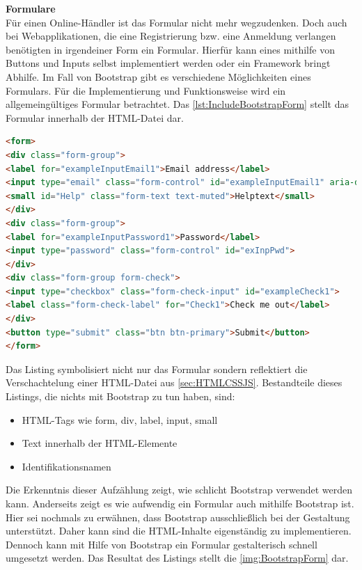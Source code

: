 \documentclass[a4paper,titlepage,halfparskip,12pt]{scrreprt}
\begin{document}
\begin{onehalfspacing}
\textbf{Formulare}\\
Für einen Online-Händler ist das Formular nicht mehr wegzudenken. Doch auch bei Webapplikationen, die eine Registrierung bzw. eine Anmeldung verlangen benötigten in irgendeiner Form ein Formular. Hierfür kann eines mithilfe von Buttons und Inputs selbst implementiert werden oder ein Framework bringt Abhilfe. Im Fall von Bootstrap gibt es verschiedene Möglichkeiten eines Formulars. Für die Implementierung und Funktionsweise wird ein allgemeingültiges Formular betrachtet. Das \autoref{lst:IncludeBootstrapForm} stellt das Formular innerhalb der HTML-Datei dar.
\begin{lstlisting}[language=HTML,caption=Implmentierung eines Formulars \cite{bootstrapOnline},label={lst:IncludeBootstrapForm}]
<form>
<div class="form-group">
<label for="exampleInputEmail1">Email address</label>
<input type="email" class="form-control" id="exampleInputEmail1" aria-describedby="emailHelp">
<small id="Help" class="form-text text-muted">Helptext</small>
</div>
<div class="form-group">
<label for="exampleInputPassword1">Password</label>
<input type="password" class="form-control" id="exInpPwd">
</div>
<div class="form-group form-check">
<input type="checkbox" class="form-check-input" id="exampleCheck1">
<label class="form-check-label" for="Check1">Check me out</label>
</div>
<button type="submit" class="btn btn-primary">Submit</button>
</form>
\end{lstlisting}
Das Listing symbolisiert nicht nur das Formular sondern reflektiert die Verschachtelung einer HTML-Datei aus \autoref{sec:HTMLCSSJS}. Bestandteile dieses Listings, die nichts mit Bootstrap zu tun haben, sind:
\begin{itemize}
	\item HTML-Tags wie form, div, label, input, small
	\item Text innerhalb der HTML-Elemente
	\item Identifikationsnamen
\end{itemize}
Die Erkenntnis dieser Aufzählung zeigt, wie schlicht Bootstrap verwendet werden kann. Anderseits zeigt es wie aufwendig ein Formular auch mithilfe Bootstrap ist. Hier sei nochmals zu erwähnen, dass Bootstrap ausschließlich bei der Gestaltung unterstützt. Daher kann sind die HTML-Inhalte eigenständig zu implementieren. Dennoch kann mit Hilfe von Bootstrap ein Formular gestalterisch schnell umgesetzt werden. Das Resultat des Listings stellt die \autoref{img:BootstrapForm} dar. \cite{bootstrapOnline}
\begin{figure}[h]

\end{figure}
\end{onehalfspacing}
\end{document}
